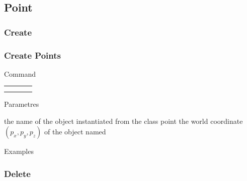 \documentclass[10pt]{beamer}
\begin{document}
\subsection{Point}

\subsubsection{Create}

\begin{frame}[t] \frametitle{Create Points}

	\begin{block}{Command} 
		\begin{tabularx}{\textwidth}{@{}l@{}l@{}l@{}R}
			 &
			  	 &
			  	 & \InstrItem \\
			 &
				 &
				 & \InstrItem
		\end{tabularx}
	\end{block}

	\begin{block}{Parametres} \begin{itemize}
		 the name of the object instantiated from the class point
		     the world coordinate $(p_x, p_y, p_z)$ of the object named 
	\end{itemize} \end{block}

	\begin{block}{Examples}
	\end{block}

\end{frame}

\subsubsection{Delete}
\end{document}
